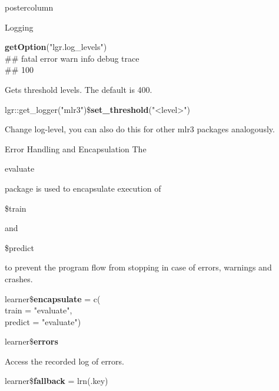 \documentclass{beamer}
\newcommand{\codeinline}[1]{\begin{codeboxinline}#1\end{codeboxinline}}
\begin{document}
\begin{withoutheader}
\begin{frame}[fragile]{}
\begin{columns}
\begin{column}{.245\textwidth}
\begin{beamercolorbox}[center]{postercolumn}
\begin{minipage}{.98\textwidth}
{\begin{myblock}{Logging}
							\\
							\begin{codeboxmultiline}[width=23.1cm]
								\textbf{getOption}("lgr.log\_levels")\\
								\#\# fatal error  warn  info debug trace\\ 
								\#\# 100 \space{} \space{}  \space 500 \space{}
							\end{codeboxmultiline}
							Gets threshold levels. The default is 400. 
							\\
							\begin{codeboxmultiline}[width=25cm]
								\footnotesize{
								lgr::get\_logger("mlr3")\$\textbf{set\_threshold}("<level>")
							}
							\end{codeboxmultiline}
							Change log-level, you can also do this for other mlr3 packages analogously.
						\end{myblock}
						\begin{myblock}{Error Handling and Encapsulation}
							The \codeinline{evaluate} package is used to encapsulate execution of \codeinline{\$train} and \codeinline{\$predict} to prevent the program flow from stopping in case of errors, warnings and crashes.
							\\
							\begin{codeboxmultiline}[width=16cm]
								learner\$\textbf{encapsulate} = c(\\
								\hspace*{1ex} train = "evaluate", \\
								\hspace*{1ex} predict = "evaluate")
							\end{codeboxmultiline}
							\begin{codebox}
								learner\$\textbf{errors}
							\end{codebox}
							Access the recorded log of errors.
							\vspace{1em}
							\\
							\begin{codebox}
								learner\$\textbf{fallback} = lrn(.key)

\end{codebox}
\end{myblock}}
\end{minipage}
\end{beamercolorbox}
\end{column}
\end{columns}
\end{frame}
\end{withoutheader}
\end{document}

